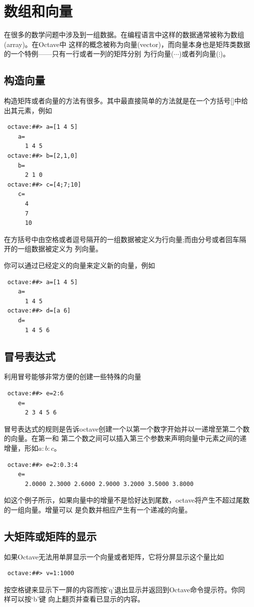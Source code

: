 \documentclass[UTF8,adobefonts]{ctexart}
\begin{document}
\section{数组和向量}
在很多的数学问题中涉及到一组数据。在编程语言中这样的数据通常被称为数组(array)。在Octave中
这样的概念被称为向量(vector)，而向量本身也是矩阵类数据的一个特例——只有一行或者一列的矩阵分别
为行向量($\cdots$)或者列向量($\vdots$)。

\subsection{构造向量}
构造矩阵或者向量的方法有很多。其中最直接简单的方法就是在一个方括号[]中给出其元素，例如
\begin{verbatim}
 octave:##> a=[1 4 5]
    a=
      1 4 5
 octave:##> b=[2,1,0]
    b=
      2 1 0
 octave:##> c=[4;7;10]
    c=
      4
      7
      10

\end{verbatim}
在方括号中由空格或者逗号隔开的一组数据被定义为行向量;而由分号或者回车隔开的一组数据被定义为
列向量。

你可以通过已经定义的向量来定义新的向量，例如
\begin{verbatim}
 octave:##> a=[1 4 5]
    a=
      1 4 5
 octave:##> d=[a 6]
    d=
      1 4 5 6
\end{verbatim}

\subsection{冒号表达式}
利用冒号能够非常方便的创建一些特殊的向量
\begin{verbatim}
 octave:##> e=2:6
    e=
      2 3 4 5 6
\end{verbatim}

冒号表达式的规则是告诉octave创建一个以第一个数字开始并以一递增至第二个数的向量。在第一和
第二个数之间可以插入第三个参数来声明向量中元素之间的递增量，形如$a:b:c$。
\begin{verbatim}
 octave:##> e=2:0.3:4
    e=
      2.0000 2.3000 2.6000 2.9000 3.2000 3.5000 3.8000
\end{verbatim}
如这个例子所示，如果向量中的增量不是恰好达到尾数，octave将产生不超过尾数的一组向量。增量可以
是负数并相应产生有一个递减的向量。

\subsection{大矩阵或矩阵的显示}
如果Octave无法用单屏显示一个向量或者矩阵，它将分屏显示这个量比如
\begin{verbatim}
 octave:##> v=1:1000
\end{verbatim}
按空格键来显示下一屏的内容而按'q'退出显示并返回到Octave命令提示符。你同样可以按‘b’键
向上翻页并查看已显示的内容。
\end{document}
